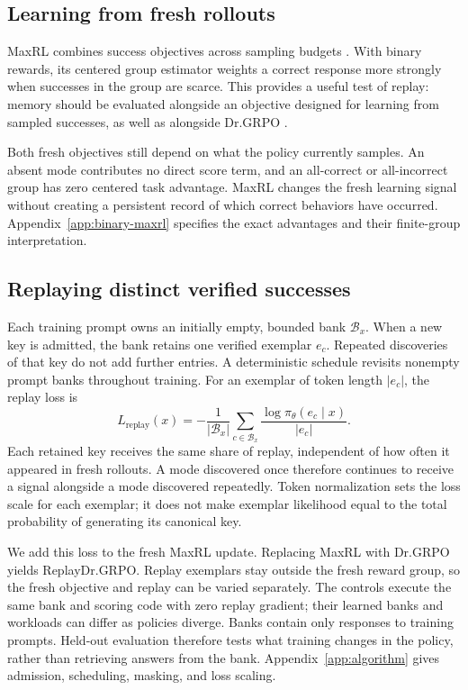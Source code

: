 \subsection{Learning from fresh rollouts}
\label{sec:maxrl-method}

MaxRL combines success objectives across sampling budgets
\citep{tajwar2026maxrl}. With binary rewards, its centered group estimator
weights a correct response more strongly when successes in the group are
scarce. This provides a useful test of replay: memory should be evaluated
alongside an objective designed for learning from sampled successes, as well
as alongside Dr.GRPO \citep{liu2025understanding}.

Both fresh objectives still depend on what the policy currently samples.
An absent mode contributes no direct score term, and an all-correct or
all-incorrect group has zero centered task advantage. MaxRL changes the
fresh learning signal without creating a persistent record of which correct
behaviors have occurred. Appendix~\ref{app:binary-maxrl} specifies the exact
advantages and their finite-group interpretation.

\subsection{Replaying distinct verified successes}
\label{sec:replay}

Each training prompt owns an initially empty, bounded bank $\mathcal B_x$.
When a new key is admitted, the bank retains one verified exemplar $e_c$.
Repeated discoveries of that key do not add further entries. A deterministic
schedule revisits nonempty prompt banks throughout training. For an exemplar
of token length $|e_c|$, the replay loss is
\begin{equation}
 L_{\mathrm{replay}}(x)=-\frac{1}{|\mathcal B_x|}
 \sum_{c\in\mathcal B_x}\frac{\log\pi_\theta(e_c\mid x)}{|e_c|}.
 \label{eq:lm-verified-replay}
\end{equation}
Each retained key receives the same share of replay, independent of how often
it appeared in fresh rollouts. A mode discovered once therefore continues to
receive a signal alongside a mode discovered repeatedly. Token normalization
sets the loss scale for each exemplar; it does not make exemplar likelihood
equal to the total probability of generating its canonical key.

We add this loss to the fresh MaxRL update. Replacing MaxRL with Dr.GRPO yields
ReplayDr.GRPO. Replay exemplars stay outside the fresh reward group, so the
fresh objective and replay can be varied separately. The controls execute
the same bank and scoring code with zero replay gradient; their learned banks
and workloads can differ as policies diverge. Banks contain only responses to
training prompts. Held-out evaluation therefore tests what training changes
in the policy, rather than retrieving answers from the bank.
Appendix~\ref{app:algorithm} gives admission, scheduling, masking, and loss scaling.

